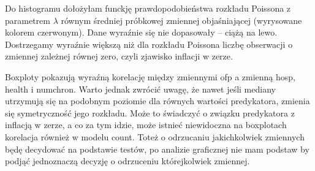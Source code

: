 \documentclass[a4paper,11pt]{article}
\begin{document}
Do histogramu dołożyłam funckję prawdopodobieństwa rozkładu Poissona z parametrem $\lambda$ równym średniej próbkowej zmiennej objaśniającej (wyrysowane kolorem czerwonym).  Dane wyraźnie się nie dopasowały -- ciążą na lewo.
Dostrzegamy wyraźnie większą niż dla rozkładu Poissona liczbę obserwacji o zmiennej zależnej równej zero, czyli zjawisko inflacji w zerze. 

Boxploty pokazują wyraźną korelację między zmiennymi ofp a zmienną hosp, health i numchron. Warto jednak zwrócić uwagę, że nawet jeśli mediany utrzymują się na podobnym poziomie dla równych wartości predykatora, zmienia się symetryczność jego rozkładu. Może to świadczyć o związku predykatora z inflacją w zerze, a co za tym idzie,  może istnieć niewidoczna na boxplotach korelacja również w modelu count. Toteż o odrzucaniu jakichkolwiek  zmiennych będę decydować na podstawie testów, po analizie  graficznej nie mam podstaw  by podjąć jednoznaczą decyzję o odrzuceniu którejkolwiek zmiennej. 
\end{document}
